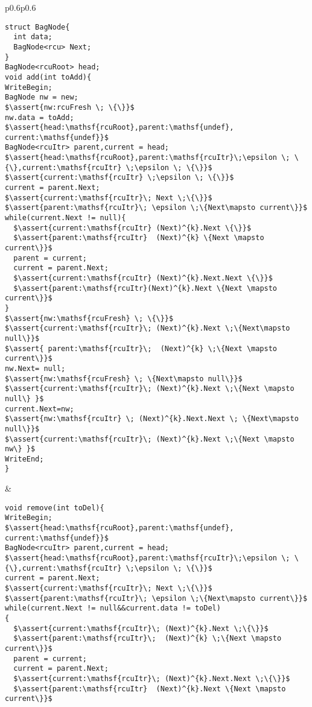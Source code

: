 \begin{figure*}[t!]
\begin{tabular}{p{}p{}}
\begin{lstlisting}[basicstyle=\scriptsize\ttfamily]
struct BagNode{
  int data;
  BagNode<rcu> Next;
}
BagNode<rcuRoot> head;
void add(int toAdd){
WriteBegin;
BagNode nw = new;
$\assert{nw:rcuFresh \; \{\}}$
nw.data = toAdd;
$\assert{head:\mathsf{rcuRoot},parent:\mathsf{undef}, current:\mathsf{undef}}$
BagNode<rcuItr> parent,current = head;
$\assert{head:\mathsf{rcuRoot},parent:\mathsf{rcuItr}\;\epsilon \; \{\},current:\mathsf{rcuItr} \;\epsilon \; \{\}}$
$\assert{current:\mathsf{rcuItr} \;\epsilon \; \{\}}$
current = parent.Next;
$\assert{current:\mathsf{rcuItr}\; Next \;\{\}}$
$\assert{parent:\mathsf{rcuItr}\; \epsilon \;\{Next\mapsto current\}}$
while(current.Next != null){
  $\assert{current:\mathsf{rcuItr} (Next)^{k}.Next \{\}}$
  $\assert{parent:\mathsf{rcuItr}  (Next)^{k} \{Next \mapsto current\}}$
  parent = current;
  current = parent.Next;
  $\assert{current:\mathsf{rcuItr} (Next)^{k}.Next.Next \{\}}$
  $\assert{parent:\mathsf{rcuItr}(Next)^{k}.Next \{Next \mapsto current\}}$
}
$\assert{nw:\mathsf{rcuFresh} \; \{\}}$
$\assert{current:\mathsf{rcuItr}\; (Next)^{k}.Next \;\{Next\mapsto null\}}$
$\assert{ parent:\mathsf{rcuItr}\;  (Next)^{k} \;\{Next \mapsto current\}}$
nw.Next= null;
$\assert{nw:\mathsf{rcuFresh} \; \{Next\mapsto null\}}$
$\assert{current:\mathsf{rcuItr}\; (Next)^{k}.Next \;\{Next \mapsto null\} }$
current.Next=nw;
$\assert{nw:\mathsf{rcuItr} \; (Next)^{k}.Next.Next \; \{Next\mapsto null\}}$
$\assert{current:\mathsf{rcuItr}\; (Next)^{k}.Next \;\{Next \mapsto nw\} }$
WriteEnd;
}
\end{lstlisting}&
\begin{lstlisting}[basicstyle=\scriptsize\ttfamily]
void remove(int toDel){
WriteBegin;
$\assert{head:\mathsf{rcuRoot},parent:\mathsf{undef}, current:\mathsf{undef}}$
BagNode<rcuItr> parent,current = head;
$\assert{head:\mathsf{rcuRoot},parent:\mathsf{rcuItr}\;\epsilon \; \{\},current:\mathsf{rcuItr} \;\epsilon \; \{\}}$
current = parent.Next;
$\assert{current:\mathsf{rcuItr}\; Next \;\{\}}$
$\assert{parent:\mathsf{rcuItr}\; \epsilon \;\{Next\mapsto current\}}$
while(current.Next != null&&current.data != toDel)
{
  $\assert{current:\mathsf{rcuItr}\; (Next)^{k}.Next \;\{\}}$
  $\assert{parent:\mathsf{rcuItr}\;  (Next)^{k} \;\{Next \mapsto current\}}$
  parent = current;
  current = parent.Next;
  $\assert{current:\mathsf{rcuItr}\; (Next)^{k}.Next.Next \;\{\}}$
  $\assert{parent:\mathsf{rcuItr}  (Next)^{k}.Next \{Next \mapsto current\}}$

\end{lstlisting}
\end{tabular}
\end{figure*}
